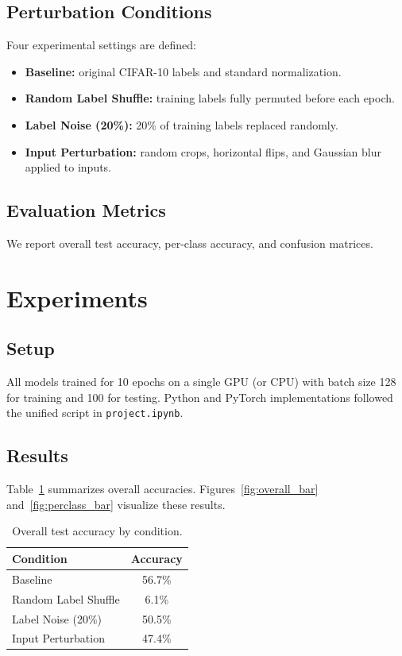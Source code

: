 \documentclass[10pt,twocolumn,letterpaper]{article}
\begin{document}
\subsection{Perturbation Conditions}
Four experimental settings are defined:
\begin{itemize}
  \item \textbf{Baseline:} original CIFAR-10 labels and standard normalization.
  \item \textbf{Random Label Shuffle:} training labels fully permuted before each epoch.
  \item \textbf{Label Noise (20\%):} 20\% of training labels replaced randomly.
  \item \textbf{Input Perturbation:} random crops, horizontal flips, and Gaussian blur applied to inputs.
\end{itemize}

\subsection{Evaluation Metrics}
We report overall test accuracy, per-class accuracy, and confusion matrices. 

\section{Experiments}
\subsection{Setup}
All models trained for 10 epochs on a single GPU (or CPU) with batch size 128 for training and 100 for testing. Python and PyTorch implementations followed the unified script in \texttt{project.ipynb}.

\subsection{Results}
Table~\ref{tab:overall} summarizes overall accuracies. Figures~\ref{fig:overall_bar} and~\ref{fig:perclass_bar} visualize these results.

\begin{table}[t]
  \centering
  \begin{tabular}{l c}
    \toprule
    Condition            & Accuracy \\
    \midrule
    Baseline             & 56.7\%   \\
    Random Label Shuffle & 6.1\%    \\
    Label Noise (20\%)  & 50.5\%   \\
    Input Perturbation   & 47.4\%   \\
    \bottomrule
  \end{tabular}
  \caption{Overall test accuracy by condition.}
  \label{tab:overall}
\end{table}
\end{document}
